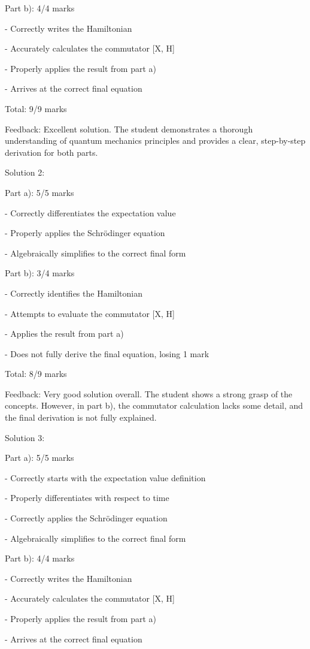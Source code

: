 \documentclass[a4paper,11pt]{article}
\begin{document}
Part b): 4/4 marks

- Correctly writes the Hamiltonian

- Accurately calculates the commutator [X, H]

- Properly applies the result from part a)

- Arrives at the correct final equation

Total: 9/9 marks

Feedback: Excellent solution. The student demonstrates a thorough understanding of quantum mechanics principles and provides a clear, step-by-step derivation for both parts.

Solution 2:

Part a): 5/5 marks

- Correctly differentiates the expectation value

- Properly applies the Schrödinger equation

- Algebraically simplifies to the correct final form

Part b): 3/4 marks

- Correctly identifies the Hamiltonian

- Attempts to evaluate the commutator [X, H]

- Applies the result from part a)

- Does not fully derive the final equation, losing 1 mark

Total: 8/9 marks

Feedback: Very good solution overall. The student shows a strong grasp of the concepts. However, in part b), the commutator calculation lacks some detail, and the final derivation is not fully explained.

Solution 3:

Part a): 5/5 marks

- Correctly starts with the expectation value definition

- Properly differentiates with respect to time

- Correctly applies the Schrödinger equation

- Algebraically simplifies to the correct final form

Part b): 4/4 marks

- Correctly writes the Hamiltonian

- Accurately calculates the commutator [X, H]

- Properly applies the result from part a)

- Arrives at the correct final equation
\end{document}
